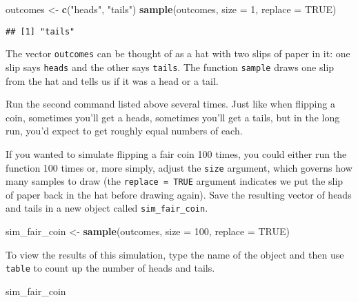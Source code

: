 \documentclass[
]{article}
\newenvironment{Shaded}{\begin{snugshade}}{\end{snugshade}}
\newcommand{\DataTypeTok}[1]{\textcolor[rgb]{0.13,0.29,0.53}{#1}}
\newcommand{\DecValTok}[1]{\textcolor[rgb]{0.00,0.00,0.81}{#1}}
\newcommand{\KeywordTok}[1]{\textcolor[rgb]{0.13,0.29,0.53}{\textbf{#1}}}
\newcommand{\NormalTok}[1]{#1}
\newcommand{\OtherTok}[1]{\textcolor[rgb]{0.56,0.35,0.01}{#1}}
\newcommand{\StringTok}[1]{\textcolor[rgb]{0.31,0.60,0.02}{#1}}
\begin{document}
\begin{Shaded}
\begin{Highlighting}[]
\NormalTok{outcomes <-}\StringTok{ }\KeywordTok{c}\NormalTok{(}\StringTok{"heads"}\NormalTok{, }\StringTok{"tails"}\NormalTok{)}
\KeywordTok{sample}\NormalTok{(outcomes, }\DataTypeTok{size =} \DecValTok{1}\NormalTok{, }\DataTypeTok{replace =} \OtherTok{TRUE}\NormalTok{)}
\end{Highlighting}
\end{Shaded}

\begin{verbatim}
## [1] "tails"
\end{verbatim}

The vector \texttt{outcomes} can be thought of as a hat with two slips
of paper in it: one slip says \texttt{heads} and the other says
\texttt{tails}. The function \texttt{sample} draws one slip from the hat
and tells us if it was a head or a tail.

Run the second command listed above several times. Just like when
flipping a coin, sometimes you'll get a heads, sometimes you'll get a
tails, but in the long run, you'd expect to get roughly equal numbers of
each.

If you wanted to simulate flipping a fair coin 100 times, you could
either run the function 100 times or, more simply, adjust the
\texttt{size} argument, which governs how many samples to draw (the
\texttt{replace\ =\ TRUE} argument indicates we put the slip of paper
back in the hat before drawing again). Save the resulting vector of
heads and tails in a new object called \texttt{sim\_fair\_coin}.

\begin{Shaded}
\begin{Highlighting}[]
\NormalTok{sim_fair_coin <-}\StringTok{ }\KeywordTok{sample}\NormalTok{(outcomes, }\DataTypeTok{size =} \DecValTok{100}\NormalTok{, }\DataTypeTok{replace =} \OtherTok{TRUE}\NormalTok{)}
\end{Highlighting}
\end{Shaded}

To view the results of this simulation, type the name of the object and
then use \texttt{table} to count up the number of heads and tails.

\begin{Shaded}
\begin{Highlighting}[]
\NormalTok{sim_fair_coin}
\end{Highlighting}
\end{Shaded}
\end{document}
